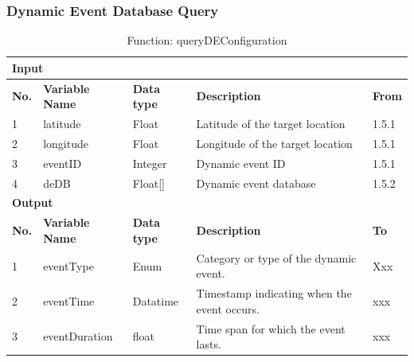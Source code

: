 \documentclass{article}
\begin{document}
\subsubsection{Dynamic Event Database Query}
\begin{table}[h]
\centering
\caption{Function: queryDEConfiguration}
\begin{tabular}{|l|l|l|l|l|}
\hline
\multicolumn{5}{|l|}{\textbf{Input}} \\ \hline
\textbf{No.} & \textbf{Variable Name} & \textbf{Data type} & \textbf{Description} & \textbf{From} \\ \hline
1 & latitude & Float & Latitude of the target location & 1.5.1 \\ \hline
2 & longitude & Float & Longitude of the target location & 1.5.1 \\ \hline
3 & eventID & Integer & Dynamic event ID & 1.5.1 \\ \hline
4 & deDB & Float[] & Dynamic event database & 1.5.2 \\ \hline
\multicolumn{5}{|l|}{\textbf{Output}} \\ \hline
\textbf{No.} & \textbf{Variable Name} & \textbf{Data type} & \textbf{Description} & \textbf{To} \\ \hline
1 & eventType & Enum & Category or type of the dynamic event. & Xxx \\ \hline
2 & eventTime & Datatime & Timestamp indicating when the event occurs. & xxx \\ \hline
3 & eventDuration & float & Time span for which the event lasts. & xxx \\ \hline
\end{tabular}
\end{table}
\end{document}
